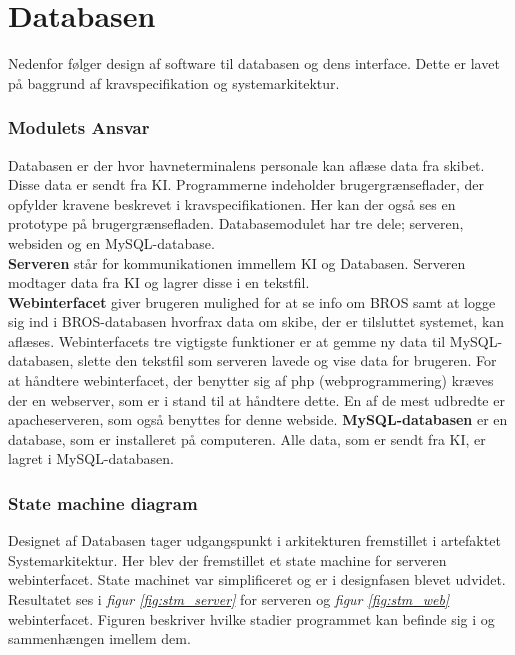 \chapter{Databasen}
Nedenfor følger design af software til databasen og dens interface. Dette er lavet på baggrund af kravspecifikation og systemarkitektur. 


\subsection{Modulets Ansvar}
Databasen er der hvor havneterminalens personale kan aflæse data fra skibet. Disse data er sendt fra KI. Programmerne indeholder brugergrænseflader, der opfylder kravene beskrevet i kravspecifikationen. Her kan der også ses en prototype på brugergrænsefladen.
Databasemodulet har tre dele; serveren, websiden og en MySQL-database. \\
\textbf{Serveren} står for kommunikationen immellem KI og Databasen. Serveren modtager data fra KI og lagrer disse i en tekstfil.\\
\textbf{Webinterfacet} giver brugeren mulighed for at se info om BROS samt at logge sig ind i BROS-databasen hvorfrax data om skibe, der er tilsluttet systemet, kan aflæses. Webinterfacets tre vigtigste funktioner er at gemme ny data til MySQL-databasen, slette den tekstfil som serveren lavede og vise data for brugeren. For at håndtere webinterfacet, der benytter sig af php (webprogrammering) kræves der en webserver, som er i stand til at håndtere dette. En af de mest udbredte er apacheserveren, som også benyttes for denne webside.
\textbf{MySQL-databasen} er en database, som er  installeret på computeren. Alle data, som er sendt fra KI, er lagret i MySQL-databasen.

\subsection{State machine diagram}
Designet af Databasen tager udgangspunkt i arkitekturen fremstillet i artefaktet Systemarkitektur. Her blev der fremstillet et state machine for serveren webinterfacet. State machinet var simplificeret og er i designfasen blevet udvidet. Resultatet ses i \textit{figur \ref{fig:stm_server}} for serveren og \textit{figur \ref{fig:stm_web}} webinterfacet. Figuren beskriver hvilke stadier programmet kan befinde sig i og sammenhængen imellem dem.

